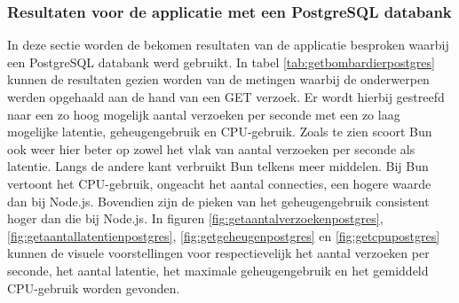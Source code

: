 \subsubsection{Resultaten voor de applicatie met een PostgreSQL databank}
In deze sectie worden de bekomen resultaten van de applicatie besproken waarbij een PostgreSQL databank werd gebruikt.
In tabel \ref{tab:getbombardierpostgres} kunnen de resultaten gezien worden van de metingen waarbij de onderwerpen werden opgehaald aan de hand van een GET verzoek.
Er wordt hierbij gestreefd naar een zo hoog mogelijk aantal verzoeken per seconde met een zo laag mogelijke latentie, geheugengebruik en CPU-gebruik.
Zoals te zien scoort Bun ook weer hier beter op zowel het vlak van aantal verzoeken per seconde als latentie.
Langs de andere kant verbruikt Bun telkens meer middelen. Bij Bun vertoont het CPU-gebruik, ongeacht het aantal connecties, een hogere waarde dan bij Node.js.
Bovendien zijn de pieken van het geheugengebruik consistent hoger dan die bij Node.js.
In figuren \ref{fig:getaantalverzoekenpostgres}, \ref{fig:getaantallatentienpostgres}, \ref{fig:getgeheugenpostgres} en \ref{fig:getcpupostgres} kunnen de visuele voorstellingen 
voor respectievelijk het aantal verzoeken per seconde, het aantal latentie, het maximale geheugengebruik en het gemiddeld CPU-gebruik worden gevonden.
